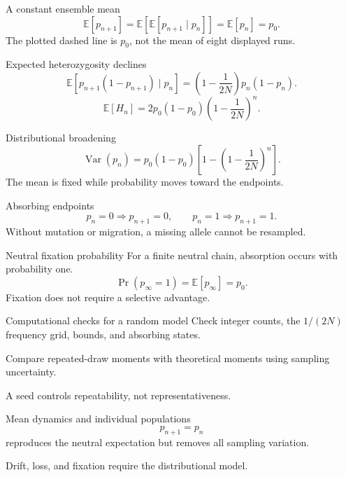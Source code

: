 \documentclass[aspectratio=169,11pt]{beamer}
\newcommand{\notestarget}{notes.pdf}\newcommand{\noteslabel}{Notes}
\begin{document}
\begin{frame}[t,fragile,label=slide-a-constant-ensemble-mean]{A constant ensemble mean}
\[\mathbb E[p_{n+1}]=\mathbb E[\mathbb E[p_{n+1}\mid p_n]]=\mathbb E[p_n]=p_0.\]\pause{} The plotted dashed line is $p_0$, not the mean of eight displayed runs.
\end{frame}
\renewcommand{\notestarget}{notes.pdf\#note-conditional-moments-and-accumulation-of-drift}
\begin{frame}[t,fragile,label=slide-expected-heterozygosity-declines]{Expected heterozygosity declines}
\[\mathbb E[p_{n+1}(1-p_{n+1})\mid p_n]=\left(1-\frac1{2N}\right)p_n(1-p_n).\]\pause{}\[\mathbb E[H_n]=2p_0(1-p_0)\left(1-\frac1{2N}\right)^n.\]
\end{frame}
\renewcommand{\notestarget}{notes.pdf\#note-conditional-moments-and-accumulation-of-drift}
\begin{frame}[t,fragile,label=slide-distributional-broadening]{Distributional broadening}
\[\operatorname{Var}(p_n)=p_0(1-p_0)\left[1-\left(1-\frac1{2N}\right)^n\right].\]\pause{} The mean is fixed while probability moves toward the endpoints.
\end{frame}
\renewcommand{\notestarget}{notes.pdf\#note-absorption-and-fixation-probability}
\begin{frame}[t,fragile,label=slide-absorbing-endpoints]{Absorbing endpoints}
\[p_n=0\Rightarrow p_{n+1}=0,\qquad p_n=1\Rightarrow p_{n+1}=1.\]\pause{} Without mutation or migration, a missing allele cannot be resampled.
\end{frame}
\renewcommand{\notestarget}{notes.pdf\#note-absorption-and-fixation-probability}
\begin{frame}[t,fragile,label=slide-neutral-fixation-probability]{Neutral fixation probability}
For a finite neutral chain, absorption occurs with probability one.\pause{}\[\Pr(p_\infty=1)=\mathbb E[p_\infty]=p_0.\] Fixation does not require a selective advantage.
\end{frame}
\renewcommand{\notestarget}{notes.pdf\#note-simulation-reproducibility-and-stochastic-verification}
\begin{frame}[t,fragile,label=slide-computational-checks-for-a-random-model]{Computational checks for a random model}
Check integer counts, the $1/(2N)$ frequency grid, bounds, and absorbing states.\pause{}\par\medskip Compare repeated-draw moments with theoretical moments using sampling uncertainty.\par\medskip A seed controls repeatability, not representativeness.
\end{frame}
\renewcommand{\notestarget}{notes.pdf\#note-simulation-reproducibility-and-stochastic-verification}
\begin{frame}[t,fragile,label=slide-mean-dynamics-and-individual-populations]{Mean dynamics and individual populations}
\[p_{n+1}=p_n\] reproduces the neutral expectation but removes all sampling variation.\pause{}\par\medskip Drift, loss, and fixation require the distributional model.
\end{frame}
\end{document}
